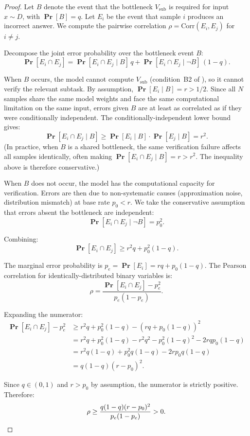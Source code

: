\documentclass{article}
\theoremstyle{definition}
\theoremstyle{remark}
\renewcommand{\Pr}{\operatorname{\mathbf{Pr}}}
\begin{document}
\begin{proof}
Let $B$ denote the event that the bottleneck $V_{\mathrm{sub}}$ is required for input $x \sim D$, with $\Pr[B] = q$.
Let $E_i$ be the event that sample $i$ produces an incorrect answer. We compute the pairwise correlation $\rho = \mathrm{Corr}(E_i, E_j)$ for $i \neq j$.

Decompose the joint error probability over the bottleneck event $B$:
\[
\Pr[E_i \cap E_j] = \Pr[E_i \cap E_j \mid B]\,q + \Pr[E_i \cap E_j \mid \neg B]\,(1-q).
\]

When $B$ occurs, the model cannot compute $V_{\mathrm{sub}}$ (condition~B2 of ), so it cannot verify the relevant subtask.
By assumption, $\Pr[E_i \mid B] = r > 1/2$.
Since all $N$ samples share the same model weights and face the same computational limitation on the same input, errors given $B$ are at least as correlated as if they were conditionally independent.
The conditionally-independent lower bound gives:
\[
\Pr[E_i \cap E_j \mid B] \geq \Pr[E_i \mid B] \cdot \Pr[E_j \mid B] = r^2.
\]
(In practice, when $B$ is a shared bottleneck, the same verification failure affects all samples identically, often making $\Pr[E_i \cap E_j \mid B] = r > r^2$. The inequality above is therefore conservative.)

When $B$ does not occur, the model has the computational capacity for verification.
Errors are then due to non-systematic causes (approximation noise, distribution mismatch) at base rate $p_0 < r$.
We take the conservative assumption that errors absent the bottleneck are independent:
\[
\Pr[E_i \cap E_j \mid \neg B] = p_0^2.
\]

Combining:
\[
\Pr[E_i \cap E_j] \geq r^2 q + p_0^2 (1-q).
\]

The marginal error probability is $p_e = \Pr[E_i] = rq + p_0(1-q)$.
The Pearson correlation for identically-distributed binary variables is:
\[
\rho = \frac{\Pr[E_i \cap E_j] - p_e^2}{p_e(1-p_e)}.
\]

Expanding the numerator:
\begin{align*}
\Pr[E_i \cap E_j] - p_e^2 &\geq r^2 q + p_0^2(1-q) - (rq + p_0(1-q))^2 \\
&= r^2 q + p_0^2(1-q) - r^2 q^2 - p_0^2(1-q)^2 - 2rqp_0(1-q) \\
&= r^2 q(1-q) + p_0^2 q(1-q) - 2rp_0 q(1-q) \\
&= q(1-q)(r - p_0)^2.
\end{align*}

Since $q \in (0,1)$ and $r > p_0$ by assumption, the numerator is strictly positive. Therefore:
\[
\rho \geq \frac{q(1-q)(r - p_0)^2}{p_e(1 - p_e)} > 0.  \qedhere
\]
\end{proof}
\end{document}
